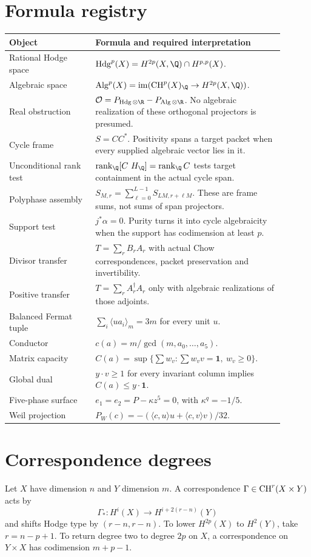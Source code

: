 \chapter{Formula registry}
\begin{longtable}{p{0.29\linewidth}p{0.61\linewidth}}
\toprule
Object & Formula and required interpretation\\
\midrule
Rational Hodge space & $\Hdg^p(X)=H^{2p}(X,\Q)\cap H^{p,p}(X)$.\\
Algebraic space & $\Alg^p(X)=\im(\CH^p(X)_{\Q}\to H^{2p}(X,\Q))$.\\
Real obstruction & $\mathcal O=P_{\Hdg\otimes\R}-P_{\Alg\otimes\R}$. No algebraic realization of these orthogonal projectors is presumed.\\
Cycle frame & $S=CC^*$. Positivity spans a target packet when every supplied algebraic vector lies in it.\\
Unconditional rank test & $\rank_{\Q}[C\ H_{\Q}]=\rank_{\Q}C$ tests target containment in the actual cycle span.\\
Polyphase assembly & $S_{M,r}=\sum_{\ell=0}^{L-1}S_{LM,r+\ell M}$. These are frame sums, not sums of span projectors.\\
Support test & $j^*\alpha=0$. Purity turns it into cycle algebraicity when the support has codimension at least $p$.\\
Divisor transfer & $T=\sum_rB_rA_r$ with actual Chow correspondences, packet preservation and invertibility.\\
Positive transfer & $T=\sum_rA_r^\dagger A_r$ only with algebraic realizations of those adjoints.\\
Balanced Fermat tuple & $\sum_i\langle ua_i\rangle_m=3m$ for every unit $u$.\\
Conductor & $c(a)=m/\gcd(m,a_0,\ldots,a_5)$.\\
Matrix capacity & $C(a)=\sup\{\sum w_v:\sum w_vv=\mathbf1,\ w_v\ge0\}$.\\
Global dual & $y\cdot v\ge1$ for every invariant column implies $C(a)\le y\cdot\mathbf1$.\\
Five-phase surface & $e_1=e_2=P-\kappa z^5=0$, with $\kappa^q=-1/5$.\\
Weil projection & $P_W(c)=-(\langle c,u\rangle u+\langle c,v\rangle v)/32$.\\
\bottomrule
\end{longtable}

\chapter{Correspondence degrees}
Let $X$ have dimension $n$ and $Y$ dimension $m$. A correspondence $\Gamma\in\operatorname{CH}^r(X\times Y)$ acts by
\[
\Gamma_*:H^i(X)\longrightarrow H^{i+2(r-n)}(Y)
\]
and shifts Hodge type by $(r-n,r-n)$. To lower $H^{2p}(X)$ to $H^2(Y)$, take $r=n-p+1$. To return degree two to degree $2p$ on $X$, a correspondence on $Y\times X$ has codimension $m+p-1$.

